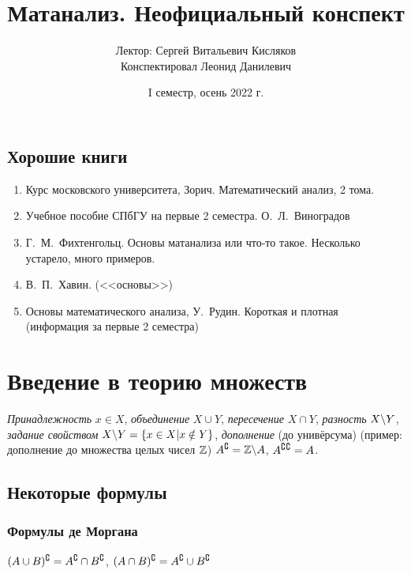 \documentclass[a4paper]{report}
\date{I семестр, осень 2022 г.}
\title{Матанализ. Неофициальный конспект}
\author{Лектор: Сергей Витальевич Кисляков\\ Конспектировал Леонид Данилевич}
\begin{document}
    \maketitle
    \tableofcontents
    \newpage
    \setcounter{lection}{0}

    \section*{Хорошие книги}

    \begin{enumerate}
        \item Курс московского университета, Зорич.
        Математический анализ, 2 тома.
        \item Учебное пособие СПбГУ на первые 2 семестра.
        О.\ Л.\ Виноградов
        \item Г.\ М.\ Фихтенгольц.
        Основы матанализа или что-то такое.
        Несколько устарело, много примеров.
        \item В.\ П.\ Хавин. (<<основы>>)
        \item Основы математического анализа, У.\ Рудин.
        Короткая и плотная (информация за первые 2 семестра)
    \end{enumerate}


    \chapter{Введение в теорию множеств}


    \emph{Принадлежность} $x \in X$, \emph{объединение} $X \cup Y$, \emph{пересечение} $X \cap Y$, \emph{разность} $X \backslash Y$, \emph{задание свойством} $X \backslash Y = \{ x \in X | x \notin Y \}$, \emph{дополнение} (до унивёрсума) (пример: дополнение до множества целых чисел $\mathbb{Z}$) $A{}^\complement = \mathbb{Z} \backslash A$, $A{}^\complement{}^\complement = A$.


    \section{Некоторые формулы}

    \subsection{Формулы де Моргана}
    $(A\cup B){}^\complement = A{}^\complement \cap B{}^\complement$, $(A\cap B){}^\complement = A{}^\complement \cup B{}^\complement$

\end{document}
